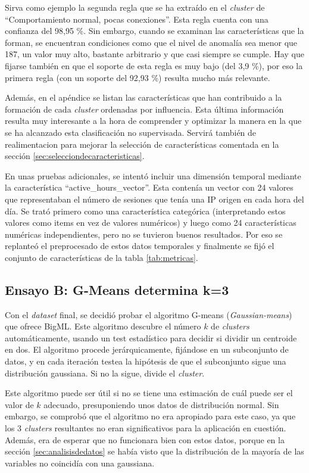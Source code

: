 Sirva como ejemplo la segunda regla que se ha extraído en el \emph{cluster} de ``Comportamiento normal, pocas conexiones''.
Esta regla cuenta con una confianza del 98,95 \%.
Sin embargo, cuando se examinan las características que la forman, se encuentran condiciones como que el nivel de anomalía sea menor que 187,
un valor muy alto, bastante arbitrario y que casi siempre se cumple.
Hay que fijarse también en que el soporte de esta regla es muy bajo (del 3,9 \%), por eso la primera regla (con un soporte del 92,93 \%) resulta mucho más relevante.

Además, en el apéndice se listan las características que han contribuido a la formación de cada \emph{cluster} ordenadas por influencia.
Esta última información resulta muy interesante a la hora de comprender y optimizar la manera en la que se ha alcanzado esta clasificación no supervisada.
Servirá también de realimentacion para mejorar la selección de características comentada en la sección \ref{sec:selecciondecaracteristicas}.

En unas pruebas adicionales, se intentó incluir una dimensión temporal mediante la característica ``active\_hours\_vector''.
Esta contenía un vector con 24 valores que representaban el número de sesiones que tenía una IP origen en cada hora del día.
Se trató primero como una característica categórica (interpretando estos valores como items en vez de valores numéricos) y luego como 24 características numéricas independientes,
pero no se tuvieron buenos resultados.
Por eso se replanteó el preprocesado de estos datos temporales y finalmente se fijó el conjunto de características de la tabla \ref{tab:metricas}.

\subsection{Ensayo B: G-Means determina k=3}\label{subsec:ensayoB}

Con el \emph{dataset} final, se decidió probar el algoritmo G-means (\emph{Gaussian-means}) que ofrece BigML.
Este algoritmo descubre el número $k$ de \emph{clusters} automáticamente, usando un test estadístico para decidir si dividir un centroide en dos.
El algoritmo procede jerárquicamente, fijándose en un subconjunto de datos, y en cada iteración testea la hipótesis de que el subconjunto sigue una distribución gaussiana.
Si no la sigue, divide el \emph{cluster}.

Este algoritmo puede ser útil si no se tiene una estimación de cuál puede ser el valor de $k$ adecuado, presuponiendo unos datos de distribución normal.
Sin embargo, se comprobó que el algoritmo no era apropiado para este caso, ya que los 3 \emph{clusters} resultantes no eran significativos para la aplicación en cuestión.
Además, era de esperar que no funcionara bien con estos datos, porque en la sección \ref{sec:analisisdedatos} se había visto que la distribución de la mayoría de las variables no coincidía con una gaussiana.

